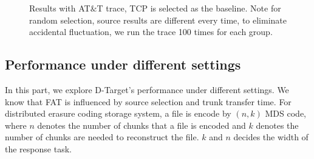 \documentclass{IEEEtran}
\begin{document}
\begin{figure}[!t]
\centering
{}
\hspace{0.1in}
\hspace{0.1in}
\caption{Results with AT$\&$T trace, TCP is selected as the baseline. Note for random selection, source results are different every time, to eliminate accidental fluctuation, we run the trace 100 times for each group. }
\label{trace_fig}
\vspace{-0.1 in}
\end{figure}


\subsection{Performance under different settings}

In this part, we explore D-Target's performance under different settings. 
We know that FAT is influenced by source selection and trunk transfer time.
For distributed erasure coding storage system, a file is encode by  $(n, k)$ MDS code,
where $n$ denotes the number of chunks that a file is encoded and $k$ denotes the number of chunks are needed to reconstruct the file.
$k$ and $n$ decides the width of the response task.
 
\end{document}

